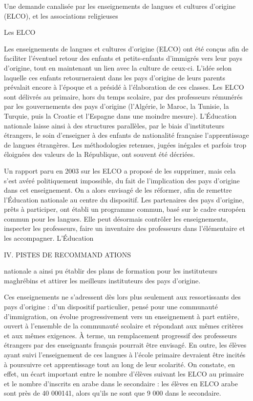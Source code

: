 Une demande canalisée par les enseignements de langues et cultures
d'origine (ELCO), et les associations religieuses

Les ELCO


Les enseignements de langues et cultures d'origine (ELCO) ont été conçus
afin de faciliter l'éventuel retour des enfants et petits-enfants
d'immigrés vers leur pays d'origine, tout en maintenant un lien avec la
culture de ceux-ci. L'idée selon laquelle ces enfants retourneraient
dans les pays d'origine de leurs parents prévalait encore à l'époque et
a présidé à l'élaboration de ces classes. Les ELCO sont délivrés au
primaire, hors du temps scolaire, par des professeurs rémunérés par les
gouvernements des pays d'origine (l'Algérie, le Maroc, la Tunisie, la
Turquie, puis la Croatie et l'Espagne dans une moindre mesure).
L'Éducation nationale laisse ainsi à des structures parallèles, par le
biais d'instituteurs étrangers, le soin d'enseigner à des enfants de
nationalité française l'apprentissage de langues étrangères. Les
méthodologies retenues, jugées inégales et parfois trop éloignées des
valeurs de la République, ont souvent été décriées.

Un rapport paru en 2003 sur les ELCO a proposé de les supprimer, mais
cela s'est avéré politiquement impossible, du fait de l'implication des
pays d'origine dans cet enseignement. On a alors envisagé de les
réformer, afin de remettre l'Éducation nationale au centre du
dispositif. Les partenaires des pays d'origine, prêts à participer, ont
établi un programme commun, basé sur le cadre européen commun pour les
langues. Elle peut désormais contrôler les enseignements, inspecter les
professeurs, faire un inventaire des professeurs dans l'élémentaire et
les accompagner. L'Éducation

IV. PISTES DE RECOMMAND ATIONS

nationale a ainsi pu établir des plans de formation pour les
instituteurs maghrébins et attirer les meilleurs instituteurs des pays
d'origine.

Ces enseignements ne s'adressent dès lors plus seulement aux
ressortissants des pays d'origine : d'un dispositif particulier, pensé
pour une communauté d'immigration, on évolue progressivement vers un
enseignement à part entière, ouvert à l'ensemble de la communauté
scolaire et répondant aux mêmes critères et aux mêmes exigences. À
terme, un remplacement progressif des professeurs étrangers par des
enseignants français pourrait être envisagé. En outre, les élèves ayant
suivi l'enseignement de ces langues à l'école primaire devraient être
incités à poursuivre cet apprentissage tout au long de leur scolarité.
On constate, en effet, un écart important entre le nombre d'élèves
suivant les ELCO au primaire et le nombre d'inscrits en arabe dans le
secondaire : les élèves en ELCO arabe sont près de 40 000141, alors
qu'ils ne sont que 9 000 dans le secondaire.


